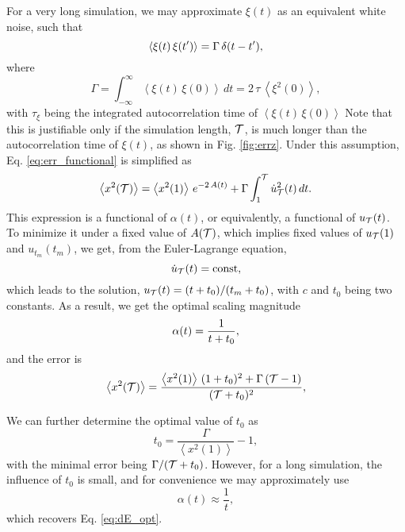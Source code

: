 \documentclass[reprint]{revtex4-1}
\begin{document}
For a very long simulation,
we may approximate $\xi(t)$ as an equivalent white noise,
such that
\begin{equation}
  \left\langle \xi(t) \, \xi(t') \right\rangle
  = \Gamma \, \delta(t - t')
  ,
  \notag
\end{equation}
where
\begin{equation}
  \Gamma
  =
  \int_{-\infty}^\infty
  \left\langle
    \xi(t) \, \xi(0)
  \right\rangle
  \, dt
  =
  2 \, \tau \,
  \left\langle
    \xi^2(0)
  \right\rangle
  ,
  \label{eq:Gamma_def}
\end{equation}
with
$\tau_\xi$ being the integrated autocorrelation time
of $\left\langle \xi(t) \, \xi(0) \right\rangle$
%
Note that this is justifiable only
if the simulation length, $\mathcal T$, is much longer than
the autocorrelation time of $\xi(t)$,
as shown in Fig. \ref{fig:errz}.
%
Under this assumption,
Eq. \eqref{eq:err_functional} is simplified as
%
\begin{equation}
  \left\langle
    x^2(\mathcal T)
  \right\rangle
  =
  \left\langle
    x^2(1)
  \right\rangle
  \, e^{ -2 \, A(t) }
  +
  \Gamma
  \int_1^{\mathcal T}
    \dot u_{\mathcal T}^2(t) \, dt
  .
  \label{eq:err_functional_wn}
\end{equation}
%
This expression is a functional of $\alpha(t)$,
or equivalently, a functional of $u_{\mathcal T}(t)$.
%
To minimize it under a fixed value of $A(\mathcal T)$,
which implies fixed values of $u_{\mathcal T}(1)$ and $u_{t_m}(t_m)$,
we get, from the Euler-Lagrange equation,
$$
\dot u_{\mathcal T}(t) = \mathrm{const},
$$
which leads to the solution,
$u_{\mathcal T}(t) = (t + t_0) / (t_m + t_0)$,
with $c$ and $t_0$ being two constants.
%
As a result, we get the optimal scaling magnitude
%
\begin{equation}
  \alpha(t) = \frac{ 1 } { t + t_0 }
  ,
  \notag
\end{equation}
%
and the error is
%
$$%
  \left\langle
    x^2(\tmax)
  \right\rangle
  =
  \frac{
    \left\langle x^2(1) \right\rangle
    \, (1 + t_0)^2
    + \Gamma \, (\tmax - 1)
  }
  {
    (\tmax + t_0)^2
  }
  ,
$$%

We can further determine the optimal value of $t_0$ as
$$
t_0 = \frac{ \Gamma } { \left\langle x^2(1) \right\rangle } - 1,
$$
%
with the minimal error being $\Gamma / (\mathcal T + t_0)$.
%
However, for a long simulation, the influence of $t_0$
is small, and for convenience we may approximately use
$$
\alpha(t) \approx \frac 1 t,
$$
which recovers Eq. \eqref{eq:dE_opt}.
\end{document}

